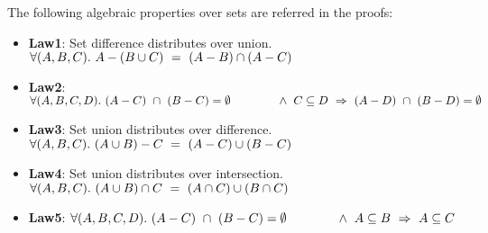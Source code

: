 
\begin{remark}
  The following algebraic properties over sets are referred in the
  proofs:
  \begin{itemize}
    \item {\bf Law1}: Set difference distributes over union. $\\\forall
      (A,B,C).~ A - (B \cup C) ~=~ (A - B) \cap (A - C)$
    \item {\bf Law2}: $\forall (A,B,C,D).~ (A - C) ~\cap~ (B - C) =
      \emptyset \\
      \hspace*{0.5in}~\wedge~ C \subseteq D ~\Rightarrow~ (A - D) ~\cap~ (B -
      D) = \emptyset$
    \item {\bf Law3}: Set union distributes over difference. $\\\forall
      (A,B,C).~ (A \cup B) - C ~=~ (A - C) \cup (B-C)$
    \item {\bf Law4}: Set union distributes over intersection.
      $\\\forall (A,B,C).~ (A \cup B) \cap C ~=~ (A \cap C) \cup
      (B \cap C)$
    \item {\bf Law5}: $\forall (A,B,C,D).~ (A - C) ~\cap~ (B - C) =
      \emptyset \\
      \hspace*{0.5in}~\wedge~ A \subseteq B ~\Rightarrow~ A \subseteq C$
  \end{itemize}
\end{remark}

